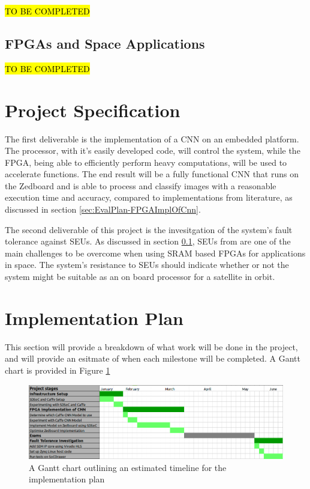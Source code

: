 \documentclass[12pt]{article}
\begin{document}
\hl{TO BE COMPLETED}

\subsection{FPGAs and Space Applications}
\label{sec:Background-FPGAsAndSpaceApplications}
\vspace{-12pt}

\hl{TO BE COMPLETED}

\section{Project Specification}
\label{sec:ProjSpec}
\vspace{-12pt}

The first deliverable is the implementation of a CNN on an embedded platform.  The processor, with it's easily developed code, will control the system, while the FPGA, being able to efficiently perform heavy computations, will be used to accelerate functions. The end result will be a fully functional CNN that runs on the Zedboard and is able to process and classify images with a reasonable execution time and accuracy, compared to implementations from literature, as discussed in section \ref{sec:EvalPlan-FPGAImplOfCnn}.

The second deliverable of this project is the invesitgation of the system's fault tolerance against SEUs. As discussed in section \ref{sec:Background-FPGAsAndSpaceApplications}, SEUs from are one of the main challenges to be overcome when using SRAM based FPGAs for applications in space. The system's resistance to SEUs should indicate whether or not the system might be suitable as an on board processor for a satellite in orbit.

\section{Implementation Plan}
\label{sec:ImpPlan}
\vspace{-12pt}

This section will provide a breakdown of what work will be done in the project, and will provide an esitmate of when each milestone will be completed. A Gantt chart is provided in Figure \ref{fig:gantt}
\begin{figure}

\centering
\includegraphics[width=1\textwidth]{../figures/gantt}

  \caption{A Gantt chart outlining an estimated timeline for the implementation plan \label{fig:gantt}}

\end{figure}
\end{document}
